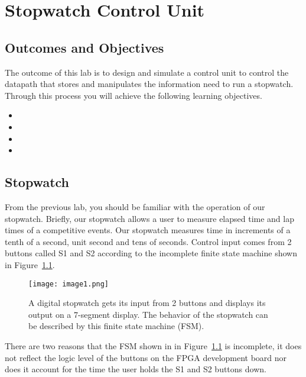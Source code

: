 \chapter{Stopwatch Control Unit}
\label{chapter:stopControl}
\graphicspath{ {./Lab10ControlUnit/Fig} }

\section{Outcomes and Objectives}

The outcome of this lab is to design and simulate
a control unit to control the datapath that stores and
manipulates the information need to run a stopwatch.
Through this process you will achieve the following
learning objectives.
\begin{itemize}
    \item {}
    \item {}
    \item {}
    \item {}
\end{itemize}

\section{Stopwatch}

From the previous lab, you should be familiar with the operation of our
stopwatch. Briefly, our stopwatch allows a user to measure elapsed time
and lap times of a competitive events. Our stopwatch measures time in
increments of a tenth of a second, unit second and tens of seconds.
Control input comes from 2 buttons called S1 and S2 according to the
incomplete finite state machine shown in Figure~\ref{fig:swCuHighLevel}.

\begin{figure}[ht]
    \texttt{[image: image1.png]}
    \caption{ A digital stopwatch gets its input from 2 buttons and displays
        its output on a 7-segment display. The behavior of the stopwatch can be
    described by this finite state machine (FSM).}
    \label{fig:swCuHighLevel}
\end{figure}

There are two reasons that the FSM shown in in Figure~\ref{fig:swCuHighLevel} is incomplete,
it does not reflect the logic level of the buttons on the FPGA development board nor
does it account for the time the user holds the S1 and S2 buttons down.


